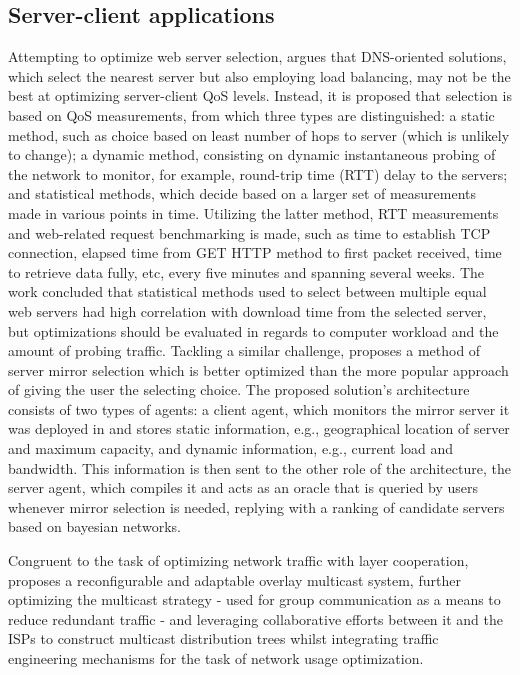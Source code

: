 \subsection{Server-client applications}

    Attempting to optimize web server selection, \cite{kenichi} argues that DNS-oriented solutions, which select the nearest server but also employing load balancing, may not be the best at optimizing server-client QoS levels.
    Instead, it is proposed that selection is based on QoS measurements, from which three types are distinguished: a static method, such as choice based on least number of hops to server (which is unlikely to change); a dynamic method, consisting on dynamic instantaneous probing of the network to monitor, for example, round-trip time (RTT) delay to the servers; and statistical methods, which decide based on a larger set of measurements made in various points in time.
    Utilizing the latter method, RTT measurements and web-related request benchmarking is made, such as time to establish TCP connection, elapsed time from GET HTTP method to first packet received, time to retrieve data fully, etc, every five minutes and spanning several weeks.
    The work concluded that statistical methods used to select between multiple equal web servers had high correlation with download time from the selected server, but optimizations should be evaluated in regards to computer workload and the amount of probing traffic.
    Tackling a similar challenge, \cite{swain} proposes a method of server mirror selection which is better optimized than the more popular approach of giving the user the selecting choice.
    The proposed solution's architecture consists of two types of agents: a client agent, which monitors the mirror server it was deployed in and stores static information, e.g., geographical location of server and maximum capacity, and dynamic information, e.g., current load and bandwidth.
    This information is then sent to the other role of the architecture, the server agent, which compiles it and acts as an oracle that is queried by users whenever mirror selection is needed, replying with a ranking of candidate servers based on bayesian networks.

    Congruent to the task of optimizing network traffic with layer cooperation, \cite{adaptable-overlay} proposes a reconfigurable and adaptable overlay multicast system, further optimizing the multicast strategy - used for group communication as a means to reduce redundant traffic - and leveraging collaborative efforts between it and the ISPs to construct multicast distribution trees whilst integrating traffic engineering mechanisms for the task of network usage optimization.

